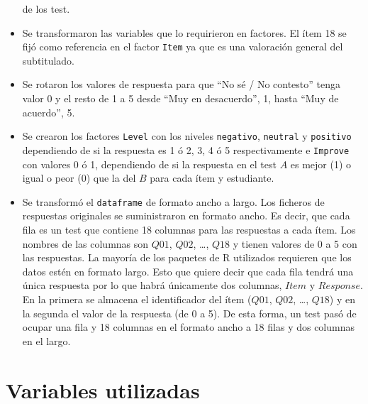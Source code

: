 \documentclass[
  12pt,
  a4paper,
  extrafontsizes,
  onecolumn,
  openright,
  table]{memoir}
\begin{document}
\begin{itemize}
  de los test.
\item
  Se transformaron las variables que lo requirieron en factores. El ítem
  18 se fijó como referencia en el factor \texttt{Item} ya que es una
  valoración general del subtitulado.
\item
  Se rotaron los valores de respuesta para que \enquote{No sé / No
  contesto} tenga valor 0 y el resto de 1 a 5 desde \enquote{Muy en
  desacuerdo}, 1, hasta \enquote{Muy de acuerdo}, 5.
\item
  Se crearon los factores \texttt{Level} con los niveles
  \texttt{negativo}, \texttt{neutral} y \texttt{positivo} dependiendo de
  si la respuesta es 1 ó 2, 3, 4 ó 5 respectivamente e \texttt{Improve}
  con valores 0 ó 1, dependiendo de si la respuesta en el test \(A\) es
  mejor (1) o igual o peor (0) que la del \(B\) para cada ítem y
  estudiante.
\item
  Se transformó el \texttt{dataframe} de formato ancho a largo. Los
  ficheros de respuestas originales se suministraron en formato ancho.
  Es decir, que cada fila es un test que contiene 18 columnas para las
  respuestas a cada ítem. Los nombres de las columnas son \(Q01\),
  \(Q02\), \ldots, \(Q18\) y tienen valores de 0 a 5 con las respuestas.
  La mayoría de los paquetes de R utilizados requieren que los datos
  estén en formato largo. Esto que quiere decir que cada fila tendrá una
  única respuesta por lo que habrá únicamente dos columnas, \(Item\) y
  \(Response\). En la primera se almacena el identificador del ítem
  (\(Q01\), \(Q02\), \ldots, \(Q18\)) y en la segunda el valor de la
  respuesta (de 0 a 5). De esta forma, un test pasó de ocupar una fila y
  18 columnas en el formato ancho a 18 filas y dos columnas en el largo.
\end{itemize}

\hypertarget{variables-utilizadas}{%
\section{Variables utilizadas}\label{variables-utilizadas}}
\end{document}
